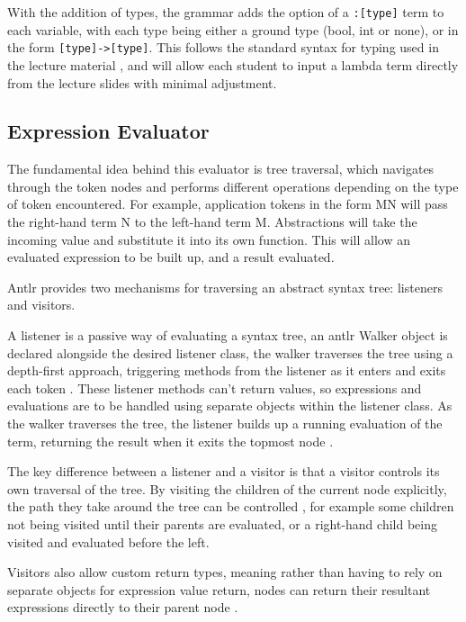 \documentclass[a4paper,12pt]{report}
\begin{document}
With the addition of types, the grammar adds the option of a \texttt{:[type]} term to each variable, with each type being either a ground type (bool, int or none), or in the form \texttt{[type]->[type]}. This follows the standard syntax for typing used in the lecture material \cite{Hankin2004} \cite{Gay2019}, and will allow each student to input a lambda term directly from the lecture slides with minimal adjustment.

\subsection{Expression Evaluator}

The fundamental idea behind this evaluator is tree traversal, which navigates through the token nodes and performs different operations depending on the type of token encountered. For example, application tokens in the form MN will pass the right-hand term N to the left-hand term M. Abstractions will take the incoming value and substitute it into its own function. This will allow an evaluated expression to be built up, and a result evaluated.

Antlr provides two mechanisms for traversing an abstract syntax tree: listeners and visitors.

A listener is a passive way of evaluating a syntax tree, an antlr Walker object is declared alongside the desired listener class, the walker traverses the tree using a depth-first approach, triggering methods from the listener as it enters and exits each token \cite{Parr2012}. These listener methods can’t return values, so expressions and evaluations are to be handled using separate objects within the listener class. As the walker traverses the tree, the listener builds up a running evaluation of the term, returning the result when it exits the topmost node \cite{Srivastav2017}.

The key difference between a listener and a visitor is that a visitor controls its own traversal of the tree. By visiting the children of the current node explicitly, the path they take around the tree can be controlled \cite{Parr2012}, for example some children not being visited until their parents are evaluated, or a right-hand child being visited and evaluated before the left.

Visitors also allow custom return types, meaning rather than having to rely on separate objects for expression value return, nodes can return their resultant expressions directly to their parent node \cite{Srivastav2017}.
\end{document}
